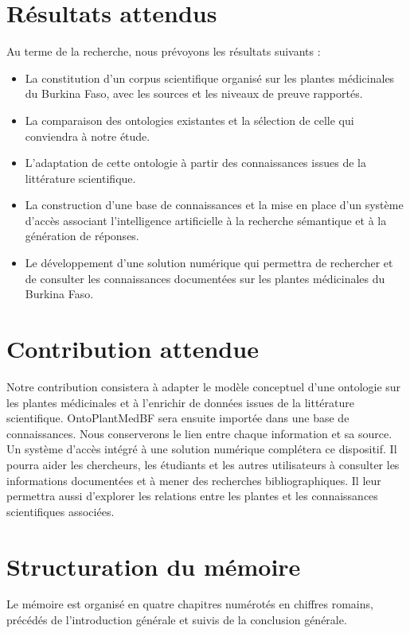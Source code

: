 \section*{Résultats attendus}

Au terme de la recherche, nous prévoyons les résultats suivants :

\begin{itemize}
\item La constitution d'un corpus scientifique organisé sur les plantes médicinales du Burkina Faso, avec les sources et les niveaux de preuve rapportés.
\item La comparaison des ontologies existantes et la sélection de celle qui conviendra à notre étude.
\item L'adaptation de cette ontologie à partir des connaissances issues de la littérature scientifique.
\item La construction d'une base de connaissances et la mise en place d'un système d'accès associant l'intelligence artificielle à la recherche sémantique et à la génération de réponses.
\item Le développement d'une solution numérique qui permettra de rechercher et de consulter les connaissances documentées sur les plantes médicinales du Burkina Faso.
\end{itemize}

\section*{Contribution attendue}

Notre contribution consistera à adapter le modèle conceptuel d'une ontologie sur les plantes médicinales et à l'enrichir de données issues de la littérature scientifique. OntoPlantMedBF sera ensuite importée dans une base de connaissances. Nous conserverons le lien entre chaque information et sa source. Un système d'accès intégré à une solution numérique complétera ce dispositif. Il pourra aider les chercheurs, les étudiants et les autres utilisateurs à consulter les informations documentées et à mener des recherches bibliographiques. Il leur permettra aussi d'explorer les relations entre les plantes et les connaissances scientifiques associées.

\section*{Structuration du mémoire}

Le mémoire est organisé en quatre chapitres numérotés en chiffres romains, précédés de l'introduction générale et suivis de la conclusion générale.

